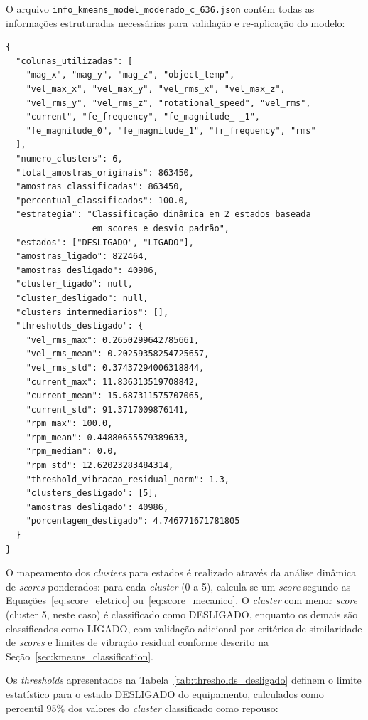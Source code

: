 O arquivo \texttt{info\_kmeans\_\allowbreak model\_\allowbreak moderado\_c\_636.json} contém todas as informações estruturadas necessárias para validação e re-aplicação do modelo:

\begin{center}
  \footnotesize
  \begin{verbatim}
{
  "colunas_utilizadas": [
    "mag_x", "mag_y", "mag_z", "object_temp",
    "vel_max_x", "vel_max_y", "vel_rms_x", "vel_max_z",
    "vel_rms_y", "vel_rms_z", "rotational_speed", "vel_rms",
    "current", "fe_frequency", "fe_magnitude_-_1",
    "fe_magnitude_0", "fe_magnitude_1", "fr_frequency", "rms"
  ],
  "numero_clusters": 6,
  "total_amostras_originais": 863450,
  "amostras_classificadas": 863450,
  "percentual_classificados": 100.0,
  "estrategia": "Classificação dinâmica em 2 estados baseada
                 em scores e desvio padrão",
  "estados": ["DESLIGADO", "LIGADO"],
  "amostras_ligado": 822464,
  "amostras_desligado": 40986,
  "cluster_ligado": null,
  "cluster_desligado": null,
  "clusters_intermediarios": [],
  "thresholds_desligado": {
    "vel_rms_max": 0.2650299642785661,
    "vel_rms_mean": 0.20259358254725657,
    "vel_rms_std": 0.37437294006318844,
    "current_max": 11.836313519708842,
    "current_mean": 15.687311575707065,
    "current_std": 91.3717009876141,
    "rpm_max": 100.0,
    "rpm_mean": 0.44880655579389633,
    "rpm_median": 0.0,
    "rpm_std": 12.62023283484314,
    "threshold_vibracao_residual_norm": 1.3,
    "clusters_desligado": [5],
    "amostras_desligado": 40986,
    "porcentagem_desligado": 4.746771671781805
  }
}
\end{verbatim}
\end{center}

O mapeamento dos \textit{clusters} para estados é realizado através da análise dinâmica de \textit{scores} ponderados: para cada \textit{cluster} (0 a 5), calcula-se um \textit{score} segundo as Equações~\ref{eq:score_eletrico} ou~\ref{eq:score_mecanico}. O \textit{cluster} com menor \textit{score} (cluster 5, neste caso) é classificado como DESLIGADO, enquanto os demais são classificados como LIGADO, com validação adicional por critérios de similaridade de \textit{scores} e limites de vibração residual conforme descrito na Seção~\ref{sec:kmeans_classification}.

Os \textit{thresholds} apresentados na Tabela~\ref{tab:thresholds_desligado} definem o limite estatístico para o estado DESLIGADO do equipamento, calculados como percentil 95\% dos valores do \textit{cluster} classificado como repouso:


